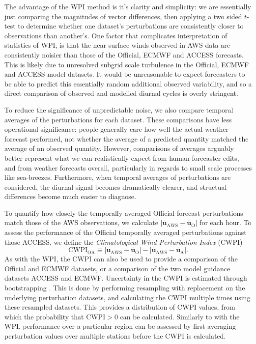 \documentclass{ametsoc}
\begin{document}
The advantage of the WPI method is it's clarity and simplicity: we are essentially just comparing the magnitudes of vector differences, then applying a two sided $t$-test to determine whether one dataset's perturbations are consistently closer to observations than another's. One factor that complicates interpretation of statistics of WPI, is that the near surface winds observed in AWS data are consistently noisier than those of the Official, ECMWF and ACCESS forecasts. This is likely due to unresolved subgrid scale turbulence in the Official, ECMWF and ACCESS model datasets. It would be unreasonable to expect forecasters to be able to predict this essentially random additional observed variability, and so a direct comparison of observed and modelled diurnal cycles is overly stringent. 

To reduce the significance of unpredictable noise, we also compare temporal averages of the perturbations for each dataset. These comparisons have less operational significance: people generally care how well the actual weather forecast performed, not whether the average of a predicted quantity matched the average of an observed quantity. However, comparisons of averages arguably better represent what we can realistically expect from human forecaster edits, and from weather forecasts overall, particularly in regards to small scale processes like sea-breezes. Furthermore, when temporal averages of perturbations are considered, the diurnal signal becomes dramatically clearer, and structual differences become much easier to diagnose. 

To quantify how closely the temporally averaged Official forecast perturbations match those of the AWS observations, we calculate 
$\left\lvert \overline{\boldsymbol{u}}_{\text{AWS}} - \overline{\boldsymbol{u}}_{\text{O}} \right\rvert$ for each hour. To assess the performance of the Official temporally averaged perturbations against those ACCESS, we define the \textit{Climatological Wind Perturbation Index} (CWPI)
\begin{equation}
\text{CWPI}_{\text{OA}} \equiv \left\lvert \overline{\boldsymbol{u}}_{\text{AWS}}-\overline{\boldsymbol{u}}_{\text{O}} \right\rvert - \left\lvert \overline{\boldsymbol{u}}_{\text{AWS}}-\overline{\boldsymbol{u}}_{\text{A}} \right\rvert.
\end{equation}
As with the WPI, the CWPI can also be used to provide a comparison of the Official and ECMWF datasets, or a comparison of the two model guidance datasets ACCESS and ECMWF. Uncertainty in the CWPI is estimated through bootstrapping \citep{efron79}. This is done by performing resampling with replacement on the underlying perturbation datasets, and calculating the CWPI multiple times using these resampled datasets. This provides a distribution of CWPI values, from which the probability that $\text{CWPI} > 0$ can be calculated. Similarly to with the WPI, performance over a particular region can be assessed by first averaging perturbation values over multiple stations before the CWPI is calculated.
\end{document}
